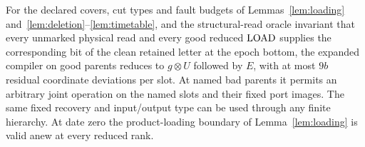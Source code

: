 \begin{lemma}\label{lem:compiled}
For the declared covers, cut types and fault budgets of Lemmas~\ref{lem:loading} and~\ref{lem:deletion}--\ref{lem:timetable}, and the structural-read oracle invariant that every unmarked physical read and every good reduced $\operatorname{LOAD}$ supplies the corresponding bit of the clean retained letter at the epoch bottom, the expanded compiler on good parents reduces to $g\otimes U$ followed by $E$, with at most $9b$ residual coordinate deviations per slot. At named bad parents it permits an arbitrary joint operation on the named slots and their fixed port images. The same fixed recovery and input/output type can be used through any finite hierarchy. At date zero the product-loading boundary of Lemma~\ref{lem:loading} is valid anew at every reduced rank.
\end{lemma}

